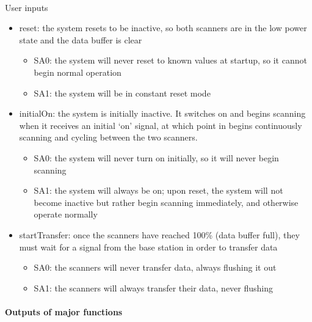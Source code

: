 \documentclass{article}
\begin{document}
  \paragraph{} User inputs
  \begin{itemize}
    \item reset: the system resets to be inactive, so both scanners are in the low power state and the data buffer is clear
    \begin{itemize}
      \item SA0: the system will never reset to known values at startup, so it cannot begin normal operation
      \item SA1: the system will be in constant reset mode
    \end{itemize}

    \item initialOn: the system is initially inactive. It switches on and begins scanning when it receives an initial ‘on’ signal, at which point in begins continuously scanning and cycling between the two scanners.
    \begin{itemize}
      \item SA0: the system will never turn on initially, so it will never begin scanning
      \item SA1: the system will always be on; upon reset, the system will not become inactive but rather begin scanning immediately, and otherwise operate normally
    \end{itemize}

    \item startTransfer: once the scanners have reached 100\% (data buffer full), they must wait for a signal from the base station in order to transfer data
    \begin{itemize}
      \item SA0: the scanners will never transfer data, always flushing it out
      \item SA1: the scanners will always transfer their data, never flushing
    \end{itemize}
  \end{itemize}

  \paragraph{Outputs of major functions}
\end{document}

